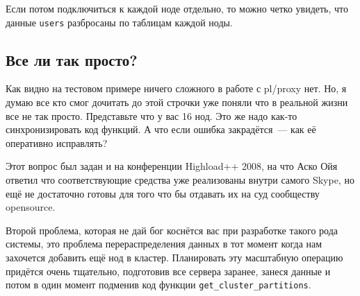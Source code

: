 Если потом подключиться к каждой ноде отдельно, то можно четко увидеть, что данные \lstinline!users! разбросаны по таблицам каждой ноды.


\subsection{Все ли так просто?}


Как видно на тестовом примере ничего сложного в работе с pl/proxy нет. Но, я думаю все кто смог дочитать до этой строчки уже поняли что в реальной жизни все не так просто. Представьте что у вас 16 нод. Это же надо как-то синхронизировать код функций. А что если ошибка закрадётся~--- как её оперативно исправлять?

Этот вопрос был задан и на конференции Highload++ 2008, на что Аско Ойя ответил что соответствующие средства уже реализованы внутри самого Skype, но ещё не достаточно готовы для того что бы отдавать их на суд сообществу opensource.

Второй проблема, которая не дай бог коснётся вас при разработке такого рода системы, это проблема перераспределения данных в тот момент когда нам захочется добавить ещё нод в кластер. Планировать эту масштабную операцию придётся очень тщательно, подготовив все сервера заранее, занеся данные и потом в один момент подменив код функции \lstinline!get_cluster_partitions!.
